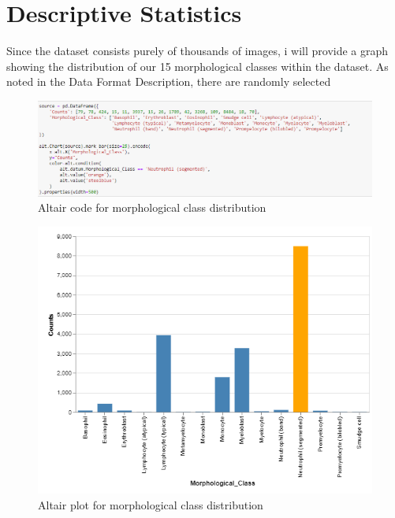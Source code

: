 \documentclass[12pt]{article}
\newcommand\tab[1][1cm]{\hspace*{#1}}
\begin{document}
\newpage






\section{Descriptive Statistics}
\tab Since the dataset consists purely of thousands of images, i will provide a graph showing the distribution of our 15 morphological classes within the dataset.
As noted in the Data Format Description, there are randomly selected 

\begin{figure}[!htb]
		\centering
		\includegraphics[width=1\textwidth]{part3_code.png}
		\caption{\label{: }Altair code for morphological class distribution}
	\end{figure} 
\begin{figure}[!htb]
		\centering
		\includegraphics[width=1\textwidth]{part3_image.png}
		\caption{\label{: }Altair plot for morphological class distribution}
	\end{figure}
\end{document}
